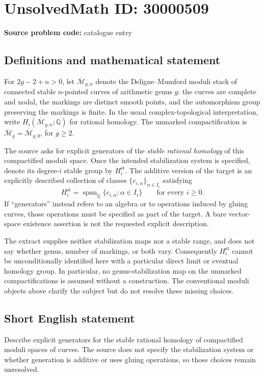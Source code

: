\documentclass[11pt]{article}
\newcommand{\Q}{\mathbb{Q}}
\begin{document}
\section*{UnsolvedMath ID: 30000509}
\textbf{Source problem code:} catalogue entry
\subsection{Definitions and mathematical statement}
For $2g-2+n>0$, let $\overline{\mathcal M}_{g,n}$ denote the Deligne--Mumford moduli stack of connected stable $n$-pointed curves of arithmetic genus $g$: the curves are complete and nodal, the markings are distinct smooth points, and the automorphism group preserving the markings is finite. In the usual complex-topological interpretation, write $H_i(\overline{\mathcal M}_{g,n};\Q)$ for rational homology. The unmarked compactification is $\overline{\mathcal M}_g=\overline{\mathcal M}_{g,0}$, for $g\geq2$.

The source asks for explicit generators of the \emph{stable rational homology} of this compactified moduli space. Once the intended stabilization system is specified, denote its degree-$i$ stable group by $H_i^{\mathrm{st}}$. The additive version of the target is an explicitly described collection of classes $\{c_{i,\alpha}\}_{\alpha\in I_i}$ satisfying
\[
H_i^{\mathrm{st}}=\operatorname{span}_{\Q}\{c_{i,\alpha}:\alpha\in I_i\}
\qquad\text{for every }i\geq0.
\]
If ``generators'' instead refers to an algebra or to operations induced by gluing curves, those operations must be specified as part of the target. A bare vector-space existence assertion is not the requested explicit description.

The extract supplies neither stabilization maps nor a stable range, and does not say whether genus, number of markings, or both vary. Consequently $H_i^{\mathrm{st}}$ cannot be unconditionally identified here with a particular direct limit or eventual homology group. In particular, no genus-stabilization map on the unmarked compactifications is assumed without a construction. The conventional moduli objects above clarify the subject but do not resolve these missing choices.
\subsection{Short English statement}
Describe explicit generators for the stable rational homology of compactified moduli spaces of curves. The source does not specify the stabilization system or whether generation is additive or uses gluing operations, so those choices remain unresolved.
\end{document}
